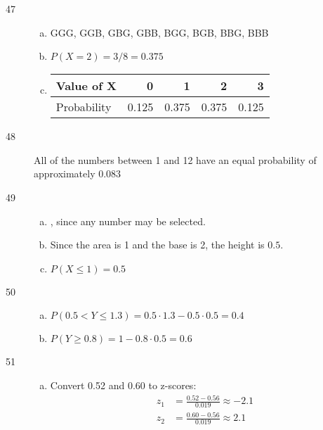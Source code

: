 \documentclass[letterpaper]{exam}
\begin{document}
\begin{description}
      \newpage

      \item[47]
        \begin{enumerate}[(a)]
          \item GGG, GGB, GBG, GBB, BGG, BGB, BBG, BBB
          \item $P(X = 2) = 3/8 = \boxed{ 0.375 }$

          \item
            \begin{tabular}[H]{lrrrr}
              \toprule
              Value of X  & 0     & 1     & 2     & 3 \\
              \midrule
              Probability & 0.125 & 0.375 & 0.375 & 0.125 \\
              \bottomrule
            \end{tabular}
        \end{enumerate}  

      \item[48]
        All of the numbers between 1 and 12 have an equal probability of
        approximately $\boxed{ 0.083 }$

      \item[49]
        \begin{enumerate}[(a)]
          \item {}, since any number may be selected.

          \item Since the area is 1 and the base is 2, the height is $\boxed{ 0.5 }$.

          \item $P(X \leq 1) = \boxed{ 0.5 }$

        \end{enumerate}  

      \item[50]
        \begin{enumerate}[(a)]
          \item $P(0.5 < Y \leq 1.3) = 0.5 \cdot 1.3 - 0.5 \cdot 0.5 = \boxed{ 0.4 }$
          \item $P(Y \geq 0.8) = 1 - 0.8 \cdot 0.5= \boxed{ 0.6 }$
        \end{enumerate}  

      \pagebreak

      \item[51]
        \begin{enumerate}[(a)]
          \item Convert 0.52 and 0.60 to z-scores:
            \begin{align*}
              z_1 & = \frac{0.52 - 0.56}{0.019} \approx -2.1 \\
              z_2 & = \frac{0.60 - 0.56}{0.019} \approx 2.1 \\
            \end{align*}


\end{enumerate}
\end{description}
\end{document}
